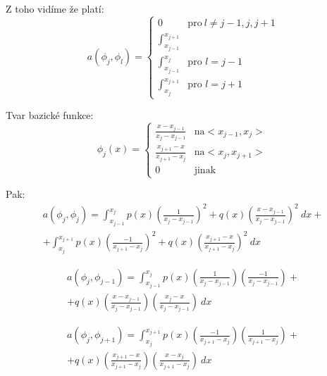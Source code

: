 \documentclass[../main.tex]{subfiles}
\begin{document}
\begin{example}[MKP v 1D]
    
    Z toho vidíme že platí:
    \begin{equation}
        a(\phi_j, \phi_l)=
        \begin{cases}
          0 & \text{pro}\ l\neq j-1, j, j+1 \\
          \int_{x_{j-1}}^{x_{j+1}} \\
          \int_{x_{j-1}}^{x_{j}} & \text{pro } l=j-1\\
          \int_{x_{j}}^{x_{j+1}} & \text{pro } l=j+1
        \end{cases}
      \end{equation}
    
    Tvar bazické funkce: 
    \begin{equation}
        \phi_j(x) = 
        \begin{cases}
            \frac{x-x_{j-1}}{x_j - x_{j-1}} & \text{na} <x_{j-1}, x_j> \\
            \frac{x_{j+1}-x}{x_{j+1} - x_{j}} & \text{na} <x_{j}, x_{j+1}> \\
            0 & \text{jinak}
        \end{cases}
    \end{equation}


Pak:
\begin{multline}
    a(\phi_j, \phi_j) = \int_{x_{j-1}}^{x_j} p(x) \left( \frac{1}{x_j - x_{j-1}} \right)^2 + q(x) \left( \frac{x-x_{j-1}}{x_j-x_{j-1}} \right)^2 \ dx +\\+ \int_{x_j}^{x_{j+1}} p(x) \left( \frac{-1}{x_{j+1} - x_j} \right)^2 + q(x) \left(\frac{x_{j+1}-x}{x_{j+1} - x_j}\right)^2 \ dx 
\end{multline}

\begin{multline}
    a(\phi_j, \phi_{j-1}) = \int_{x_{j-1}}^{x_j}  p(x) \left( \frac{1}{x_j - x_{j-1}} \right)  \left( \frac{-1}{x_{j} - x_{j-1}} \right) +\\+ q(x) \left( \frac{x-x_{j-1}}{x_j-x_{j-1}} \right) \left( \frac{x_j -x}{x_{j} - x_{j-1}} \right) \ dx
\end{multline}

\begin{multline}
    a(\phi_j, \phi_{j+1}) = \int_{x_{j}}^{x_{j+1}}  p(x) \left( \frac{-1}{x_{j+1} - x_{j}} \right)  \left( \frac{1}{x_{j+1} - x_{j}} \right) +\\+ q(x) \left( \frac{x_{j+1}-x}{x_{j+1}-x_{j}} \right) \left( \frac{x - x_j}{x_{j+1} - x_{j}} \right) \ dx
\end{multline}


\end{example}
\end{document}
